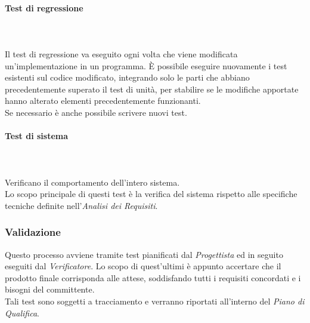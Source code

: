 \paragraph*{Test di regressione} \mbox{} \\ \mbox{} \\
Il test di regressione va eseguito ogni volta che viene modificata un’implementazione in un programma. È possibile eseguire nuovamente i test esistenti sul codice modificato, integrando solo le parti che abbiano precedentemente superato il test di unità, per stabilire se le modifiche apportate hanno alterato elementi precedentemente funzionanti.\\ Se necessario è anche possibile scrivere nuovi test.

\paragraph*{Test di sistema} \mbox{} \\ \mbox{} \\
Verificano il comportamento dell'intero sistema.\\
Lo scopo principale di questi test è la verifica del sistema rispetto alle specifiche tecniche definite nell'\textit{Analisi dei Requisiti}.

\subsubsection{Validazione}
Questo processo avviene tramite test pianificati dal \textit{Progettista} ed in seguito eseguiti dal \textit{Verificatore}.
Lo scopo di quest'ultimi è appunto accertare che il prodotto finale corrisponda alle attese, soddisfando tutti i requisiti concordati e i bisogni del committente. \\
Tali test sono soggetti a tracciamento e verranno riportati all'interno del \textit{Piano di Qualifica}.
